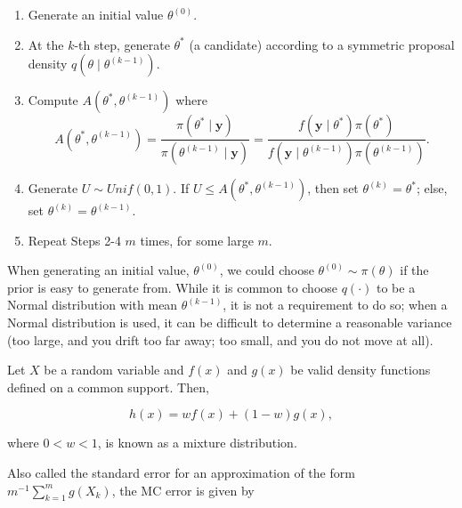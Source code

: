 \documentclass[
  letterpaper,
  DIV=11,
  numbers=noendperiod]{scrreprt}
\providecommand{\tightlist}{%
  \setlength{\itemsep}{0pt}\setlength{\parskip}{0pt}}\usepackage{longtable,booktabs,array}
\theoremstyle{definition}
\theoremstyle{plain}
\theoremstyle{definition}
\theoremstyle{remark}
\begin{document}
\begin{enumerate}
\def\labelenumi{\arabic{enumi}.}
\tightlist
\item
  Generate an initial value \(\theta^{(0)}\).\\
\item
  At the \(k\)-th step, generate \(\theta^*\) (a candidate) according to
  a symmetric proposal density
  \(q\left(\theta \mid \theta^{(k-1)}\right)\).\\
\item
  Compute \(A\left(\theta^*, \theta^{(k-1)}\right)\) where
  \[A\left(\theta^*, \theta^{(k-1)}\right) = \frac{\pi\left(\theta^* \mid \mathbf{y}\right)}{\pi\left(\theta^{(k-1)} \mid \mathbf{y}\right)} = \frac{f\left(\mathbf{y} \mid \theta^*\right) \pi\left(\theta^*\right)}{f\left(\mathbf{y} \mid \theta^{(k-1)}\right) \pi\left(\theta^{(k-1)}\right)}.\]
\item
  Generate \(U \sim Unif(0,1)\). If
  \(U \leq A\left(\theta^*, \theta^{(k-1)}\right)\), then set
  \(\theta^{(k)} = \theta^*\); else, set
  \(\theta^{(k)} = \theta^{(k-1)}\).
\item
  Repeat Steps 2-4 \(m\) times, for some large \(m\).
\end{enumerate}

When generating an initial value, \(\theta^{(0)}\), we could choose
\(\theta^{(0)} \sim \pi(\theta)\) if the prior is easy to generate from.
While it is common to choose \(q(\cdot)\) to be a Normal distribution
with mean \(\theta^{(k-1)}\), it is not a requirement to do so; when a
Normal distribution is used, it can be difficult to determine a
reasonable variance (too large, and you drift too far away; too small,
and you do not move at all).

\begin{description}
\tightlist
\item[Mixture Distribution (Definition~\ref{def-mixture-distribution})]
Let \(X\) be a random variable and \(f(x)\) and \(g(x)\) be valid
density functions defined on a common support. Then,
\end{description}

\[h(x) = wf(x) + (1 - w) g(x),\]

where \(0 < w < 1\), is known as a mixture distribution.

\begin{description}
\tightlist
\item[Monte Carlo Error (Definition~\ref{def-mc-error})]
Also called the standard error for an approximation of the form
\(m^{-1} \sum\limits_{k=1}^{m} g\left(X_k\right)\), the MC error is
given by
\end{description}
\end{document}
